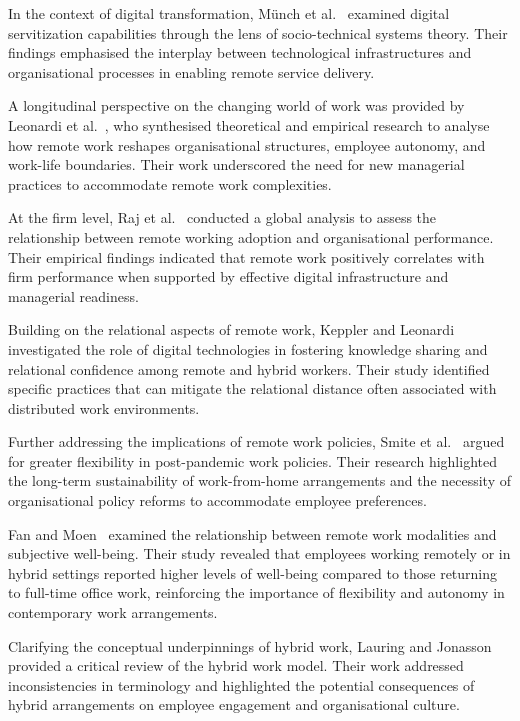 \documentclass[a4paper, conference]{IEEEtran}
\begin{document}
In the context of digital transformation, Münch et al.~\cite{munch2022capabilities} examined digital servitization capabilities through the lens of socio-technical systems theory. Their findings emphasised the interplay between technological infrastructures and organisational processes in enabling remote service delivery.

A longitudinal perspective on the changing world of work was provided by Leonardi et al.~\cite{Leonardi2024RemoteWork}, who synthesised theoretical and empirical research to analyse how remote work reshapes organisational structures, employee autonomy, and work-life boundaries. Their work underscored the need for new managerial practices to accommodate remote work complexities.

At the firm level, Raj et al.~\cite{Raj2023Remote} conducted a global analysis to assess the relationship between remote working adoption and organisational performance. Their empirical findings indicated that remote work positively correlates with firm performance when supported by effective digital infrastructure and managerial readiness.

Building on the relational aspects of remote work, Keppler and Leonardi~\cite{Keppler2023RelationalConfidence} investigated the role of digital technologies in fostering knowledge sharing and relational confidence among remote and hybrid workers. Their study identified specific practices that can mitigate the relational distance often associated with distributed work environments.

Further addressing the implications of remote work policies, Smite et al.~\cite{Smite2023WFHFlexibility} argued for greater flexibility in post-pandemic work policies. Their research highlighted the long-term sustainability of work-from-home arrangements and the necessity of organisational policy reforms to accommodate employee preferences.

Fan and Moen~\cite{Fan2023SubjectiveWellbeing} examined the relationship between remote work modalities and subjective well-being. Their study revealed that employees working remotely or in hybrid settings reported higher levels of well-being compared to those returning to full-time office work, reinforcing the importance of flexibility and autonomy in contemporary work arrangements.

Clarifying the conceptual underpinnings of hybrid work, Lauring and Jonasson~\cite{Lauring2024Hybrid} provided a critical review of the hybrid work model. Their work addressed inconsistencies in terminology and highlighted the potential consequences of hybrid arrangements on employee engagement and organisational culture.
\end{document}
